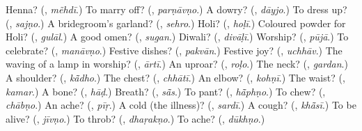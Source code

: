 \begin{tcolorbox}[breakable,colback=teal!4,colframe=teal!35!black,title={Before you move on}]
Henna? (\textbf{}, \emph{mẽhdī}.) To marry off? (\textbf{}, \emph{parṇāvṇo}.) A dowry? (\textbf{}, \emph{dāyjo}.) To dress up? (\textbf{}, \emph{sajṇo}.) A bridegroom's garland? (\textbf{}, \emph{sehro}.) Holi? (\textbf{}, \emph{hoḷī}.) Coloured powder for Holi? (\textbf{}, \emph{gulāl}.) A good omen? (\textbf{}, \emph{sugan}.) Diwali? (\textbf{}, \emph{divāḷī}.) Worship? (\textbf{}, \emph{pūjā}.) To celebrate? (\textbf{}, \emph{manāvṇo}.) Festive dishes? (\textbf{}, \emph{pakvān}.) Festive joy? (\textbf{}, \emph{uchhāv}.) The waving of a lamp in worship? (\textbf{}, \emph{ārtī}.) An uproar? (\textbf{}, \emph{roḷo}.) The neck? (\textbf{}, \emph{gardan}.) A shoulder? (\textbf{}, \emph{kā̃dho}.) The chest? (\textbf{}, \emph{chhātī}.) An elbow? (\textbf{}, \emph{kohṇī}.) The waist? (\textbf{}, \emph{kamar}.) A bone? (\textbf{}, \emph{hāḍ}.) Breath? (\textbf{}, \emph{sā̃s}.) To pant? (\textbf{}, \emph{hā̃phṇo}.) To chew? (\textbf{}, \emph{chābṇo}.) An ache? (\textbf{}, \emph{pīṛ}.) A cold (the illness)? (\textbf{}, \emph{sardī}.) A cough? (\textbf{}, \emph{khā̃sī}.) To be alive? (\textbf{}, \emph{jīvṇo}.) To throb? (\textbf{}, \emph{dhaṛakṇo}.) To ache? (\textbf{}, \emph{dūkhṇo}.)
\end{tcolorbox}
